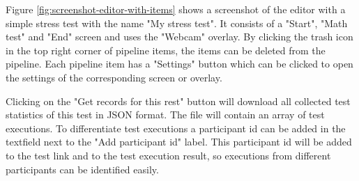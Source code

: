 Figure \ref{fig:screenshot-editor-with-items} shows a screenshot of the editor with a simple stress test with the name "My stress test".
It consists of a "Start", "Math test" and "End" screen and uses the "Webcam" overlay.
By clicking the trash icon in the top right corner of pipeline items, the items can be deleted from the pipeline.
Each pipeline item has a "Settings" button which can be clicked to open the settings of the corresponding screen or overlay.

Clicking on the "Get records for this rest" button will download all collected test statistics of this test in JSON format.
The file will contain an array of test executions.
To differentiate test executions a participant id can be added in the textfield next to the "Add participant id" label.
This participant id will be added to the test link and to the test execution result, so executions from different participants can be identified easily.
